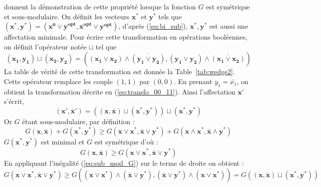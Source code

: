 \documentclass[../main/These_Mathias_Paget.tex]{subfiles}
\begin{document}
	\cite{Kahl12DAM} donnent la démonstration de cette propriété lorsque la fonction $G$ est symétrique et sous-modulaire. On définit les vecteurs $\boldsymbol{x^*}$ et $\boldsymbol{y^*}$ tels que $(\boldsymbol{x^*},\boldsymbol{y^*}) = (\boldsymbol{x^0} \vee \boldsymbol{\bar{y}^{opt}}, \boldsymbol{\bar{x}^{opt}} \vee \boldsymbol{y^{opt}}   )$, d'après (\ref{eq:bi_sub}), $\boldsymbol{x^*},\boldsymbol{y^*}$ est aussi une affectation minimale. Pour écrire cette transformation en opérations booléennes, on définit l'opérateur notée $\sqcup$ tel que
	\begin{equation}
		(\boldsymbol{x_1},\boldsymbol{y_1}) \sqcup (\boldsymbol{x_2},\boldsymbol{y_2}) = ( (\boldsymbol{x_1} \vee \boldsymbol{x_2}) \wedge \overline{(\boldsymbol{y_1} \vee \boldsymbol{y_2})}, (\boldsymbol{y_1} \vee \boldsymbol{y_2}) \wedge  \overline{(\boldsymbol{x_1} \vee \boldsymbol{x_2})} ) 
	\end{equation}
	La table de vérité de cette transformation est donnée la Table~\ref{tab:wedge2}. Cette opérateur remplace les couple $(1,1)$ par $(0,0)$. En prenant $y_1=\bar{x_1}$, on obtient la transformation décrite en (\ref{eq:transfo_00_11}). Ainsi l'affectation $\boldsymbol{x'}$ s'écrit,
	\begin{equation}
	(\boldsymbol{x'},\boldsymbol{\bar{x}'})= ((\boldsymbol{x},\boldsymbol{\bar{x}}) \sqcup (\boldsymbol{x^*},\boldsymbol{y^*})) \sqcup (\boldsymbol{x^*},\boldsymbol{y^*})
	\end{equation}
Or $G$ étant sous-modulaire, par définition :
	\begin{equation}
		G(\boldsymbol{x},\boldsymbol{\bar{x}}) + G(\boldsymbol{x^*},\boldsymbol{y^*}) \geq G(\boldsymbol{x} \vee \boldsymbol{x^*} ,\boldsymbol{\bar{x}} \vee \boldsymbol{y^*}) + G(\boldsymbol{x} \wedge \boldsymbol{x^*} ,\boldsymbol{\bar{x}} \wedge \boldsymbol{y^*})
	\end{equation}
	$G(\boldsymbol{x^*},\boldsymbol{y^*})$ est minimal et $G$ est symétrique d'où :
	\begin{equation}
	G(\boldsymbol{x},\boldsymbol{\bar{x}}) \geq G(\boldsymbol{x} \vee \boldsymbol{x^*} ,\boldsymbol{\bar{x}} \vee \boldsymbol{y^*}) \label{eq:sub_mod_G}
	\end{equation}
	En appliquant l'inégalité (\ref{eq:sub_mod_G}) sur le terme de droite on obtient :
	\begin{equation}
	G(\boldsymbol{x} \vee \boldsymbol{x^*} ,\boldsymbol{\bar{x}} \vee \boldsymbol{y^*}) \geq G( (\boldsymbol{x} \vee \boldsymbol{x^*}) \wedge \overline{(\boldsymbol{\bar{x}} \vee \boldsymbol{y^*})}, (\boldsymbol{\bar{x}} \vee \boldsymbol{y^*}) \wedge  \overline{(\boldsymbol{x} \vee \boldsymbol{x^*})} ) = G((\boldsymbol{x},\boldsymbol{\bar{x}}) \sqcup (\boldsymbol{x^*},\boldsymbol{y^*}))
	\end{equation}
\end{document}
